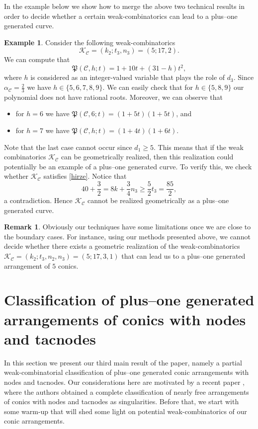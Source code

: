 \documentclass[11pt]{article}
\theoremstyle{plain}
\theoremstyle{definition}
\newtheorem{remark}[thm]{Remark}
\newtheorem{example}[thm]{Example}
\begin{document}
In the example below we show how to merge the above two technical results in order to decide whether a certain weak-combinatorics can lead to a plus--one generated curve.
\begin{example}
\label{ex35}
Consider the following weak-combinatorics
$$\mathcal{K}_{\mathcal{C}} = (k_{2};t_{3},n_{3}) = (5;17,2).$$
We can compute that
$$\mathfrak{P}(\mathcal{C},h;t) = 1+10t + (31-h)t^2,$$
where $h$ is considered as an integer-valued variable that plays the role of $d_3$. Since $\alpha_{\mathcal{C}} = \frac{2}{3}$ we have $h \in \{5,6,7,8,9\}$. We can easily check that for $h \in \{5,8,9\}$ our polynomial does not have rational roots. Moreover, we can observe that
\begin{itemize}
\item for $h=6$ we have $\mathfrak{P}(\mathcal{C},6;t) = (1+5t)(1+5t)$, and
\item for $h=7$ we have $\mathfrak{P}(\mathcal{C},h;t) = (1+4t)(1+6t)$.
\end{itemize}
Note that the last case cannot occur since $d_1 \geq 5$. This means that if the weak combinatorics $\mathcal{K}_{\mathcal{C}}$ can be geometrically realized, then this realization could potentially be an example of a plus--one generated curve. To verify this, we check whether $\mathcal{K}_{\mathcal{C}}$ satisfies \eqref{hirze}. Notice that
$$40 + \frac{3}{2} = 8k+\frac{3}{4}n_{3} \geq \frac{5}{2}t_{3} = \frac{85}{2},$$
a contradiction. Hence $\mathcal{K}_{\mathcal{C}}$ cannot be realized geometrically as a plus--one generated curve.
\end{example}
\begin{remark}
Obviously our techniques have some limitations once we are close to the boundary cases. For instance, using our methods presented above, we cannot decide whether there exists a geometric realization of the weak-combinatorics $\mathcal{K}_{\mathcal{C}} = (k_{2};t_{3}, n_{2},n_{3}) = (5;17,3,1)$ that can lead us to a plus--one generated arrangement of $5$ conics.
\end{remark}
\section{Classification of plus--one generated arrangements of conics with nodes and tacnodes}
In this section we present our third main result of the paper, namely a partial weak-combinatorial classification of plus--one generated conic arrangements with nodes and tacnodes. Our considerations here are motivated by a recent paper \cite{DJP}, where the authors obtained a complete classification of nearly free arrangements of conics with nodes and tacnodes as singularities. Before that, we start with some warm-up that will shed some light on potential weak-combinatorics of our conic arrangements.
\end{document}
